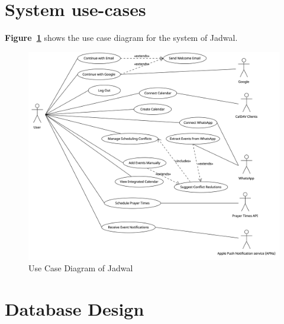 \documentclass[12pt,a4paper]{report}
\begin{document}
\section{System use-cases}

\textbf{Figure~\ref{fig:use-case-diagram}} shows the use case diagram for the system of Jadwal.

\begin{figure}[!h]
    \centering
    \includegraphics[width=\textwidth]{images/use-case-diagram.png}
    \caption{Use Case Diagram of Jadwal}
    \label{fig:use-case-diagram}
\end{figure}






















\section{Database Design}
\end{document}

